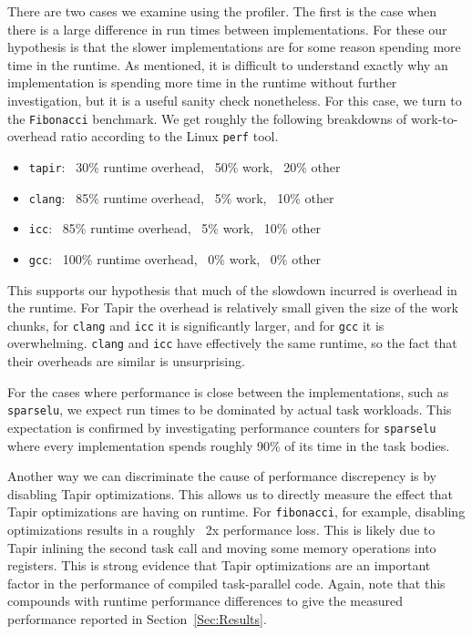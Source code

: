 \documentclass[sigconf]{acmart}
\begin{document}
There are two cases we examine using the profiler. The first is the case when
there is a large difference in run times between implementations. For these our
hypothesis is that the slower implementations are for some reason spending more
time in the runtime. As mentioned, it is difficult to understand exactly why an
implementation is spending more time in the runtime without further
investigation, but it is a useful sanity check nonetheless. For this case, we
turn to the \texttt{Fibonacci} benchmark.  We get roughly the following
breakdowns of work-to-overhead ratio according to the Linux \texttt{perf} tool.
\begin{itemize}
\item \texttt{tapir}: ~30\% runtime overhead, ~50\% work, ~20\% other
\item \texttt{clang}: ~85\% runtime overhead, ~5\% work, ~10\% other
\item \texttt{icc}: ~85\% runtime overhead, ~5\% work, ~10\% other
\item \texttt{gcc}: ~100\% runtime overhead, ~0\% work, ~0\% other
\end{itemize}
This supports our hypothesis that much of the slowdown incurred is overhead in
the runtime. For Tapir the overhead is relatively small given the size of the
work chunks, for \texttt{clang} and \texttt{icc} it is significantly larger,
and for \texttt{gcc} it is overwhelming. \texttt{clang} 
and \texttt{icc} have effectively the same runtime, so the fact that their 
overheads are similar is unsurprising. 

For the cases where performance is close between the implementations, such as
\texttt{sparselu}, we expect run times to be dominated by actual task workloads. This
expectation is confirmed by investigating performance counters for \texttt{sparselu}
where every implementation spends roughly 90\% of its time in the task
bodies.

Another way we can discriminate the cause of performance discrepency is by disabling 
Tapir optimizations. This allows us to directly measure the effect that Tapir
optimizations are having on runtime. For \texttt{fibonacci}, for example,
disabling optimizations results in a roughly ~2x performance loss. This is
likely due to Tapir inlining the second task call and moving some memory
operations into registers. This is strong evidence that Tapir optimizations are
an important factor in the performance of compiled task-parallel code. Again,
note that this compounds with runtime performance differences to give the
measured performance reported in Section~\ref{Sec:Results}.
\end{document}
